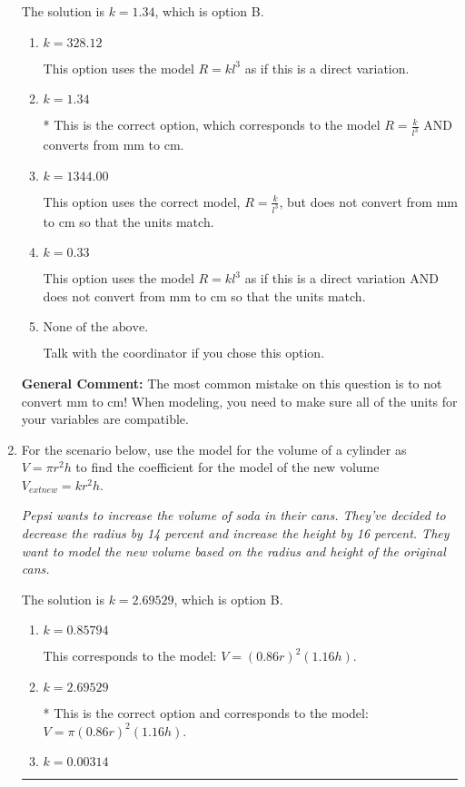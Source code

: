 \documentclass{extbook}[14pt]
\newcommand{\litem}[1]{\item #1

\rule{\textwidth}{0.4pt}}
\begin{document}
\begin{enumerate}
{The solution is \( k = 1.34 \), which is option B.\begin{enumerate}[label=\Alph*.]
\item \( k = 328.12 \)

This option uses the model $R = kl^{3}$ as if this is a direct variation.
\item \( k = 1.34 \)

* This is the correct option, which corresponds to the model $R = \frac{k}{l^{3}}$ AND converts from mm to cm.
\item \( k = 1344.00 \)

This option uses the correct model, $R = \frac{k}{l^{3}}$, but does not convert from mm to cm so that the units match.
\item \( k = 0.33 \)

This option uses the model $R = kl^{3}$ as if this is a direct variation AND does not convert from mm to cm so that the units match.
\item \( \text{None of the above.} \)

Talk with the coordinator if you chose this option.
\end{enumerate}

\textbf{General Comment:} The most common mistake on this question is to not convert mm to cm! When modeling, you need to make sure all of the units for your variables are compatible.
}
\litem{
For the scenario below, use the model for the volume of a cylinder as $V = \pi r^2 h$ to find the coefficient for the model of the new volume $V_{	ext{new}} = k r^2 h$.

\begin{center}
    \textit{ Pepsi wants to increase the volume of soda in their cans. They've decided to decrease the radius by 14 percent and increase the height by 16 percent. They want to model the new volume based on the radius and height of the original cans. }
\end{center}


The solution is \( k = 2.69529 \), which is option B.\begin{enumerate}[label=\Alph*.]
\item \( k = 0.85794 \)

This corresponds to the model: $V = (0.86 r)^2 (1.16 h)$.
\item \( k = 2.69529 \)

* This is the correct option and corresponds to the model: $V = \pi (0.86 r)^2 (1.16 h)$.
\item \( k = 0.00314 \)


\end{enumerate}}
\end{enumerate}
\end{document}
